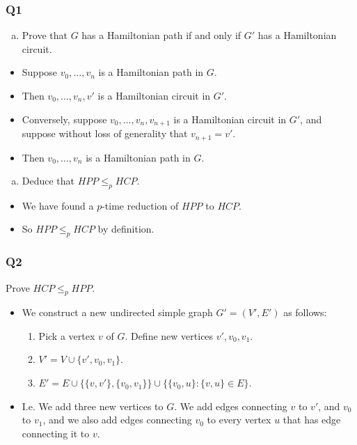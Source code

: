 \documentclass[handout]{beamer}
\begin{document}
\begin{frame}
\frametitle{Q1}
\begin{enumerate}[b)]
\item Prove that $G$ has a Hamiltonian path if and only if $G'$ has a Hamiltonian circuit.
\end{enumerate}
\begin{itemize}
\item Suppose $v_0,\ldots,v_n$ is a Hamiltonian path in $G$. 
\item Then $v_0,\ldots,v_n,v'$ is a Hamiltonian circuit in $G'$. 
\item Conversely, suppose $v_0,\ldots,v_n,v_{n+1}$ is a Hamiltonian circuit in $G'$, and suppose without loss of generality that $v_{n+1} = v'$. 
\item Then $v_0,\ldots,v_n$ is a Hamiltonian path in $G$.
\end{itemize}
\begin{enumerate}[c)]
\item Deduce that $HPP\leq_p HCP$.
\end{enumerate}
\begin{itemize}
\item We have found a $p$-time reduction of $HPP$ to $HCP$.
\item So $HPP\leq_p HCP$ by definition.
\end{itemize}
\end{frame}

\begin{frame}
\frametitle{Q2}
Prove $HCP\leq_p HPP$.
\vspace{1cm}
\begin{itemize}
\item We construct a new undirected simple graph $G'=(V',E')$ as follows:
\begin{enumerate}
\item Pick a vertex $v$ of $G$. Define new vertices $v',v_0,v_1$.
\item $V'=V\cup\{v',v_0,v_1\}$.
\item $E'=E\cup \{\{v,v'\},\{v_0,v_1\}\}\cup \{\{v_0,u\}:\{v,u\}\in E\}$. 
\end{enumerate}
\vspace{0.5cm}
\item I.e. We add three new vertices to $G$. We add edges connecting $v$ to $v'$, and $v_0$ to $v_1$, and we also add edges connecting $v_0$ to every vertex $u$ that has edge connecting it to $v$.
\end{itemize}
\end{frame}
\end{document}
